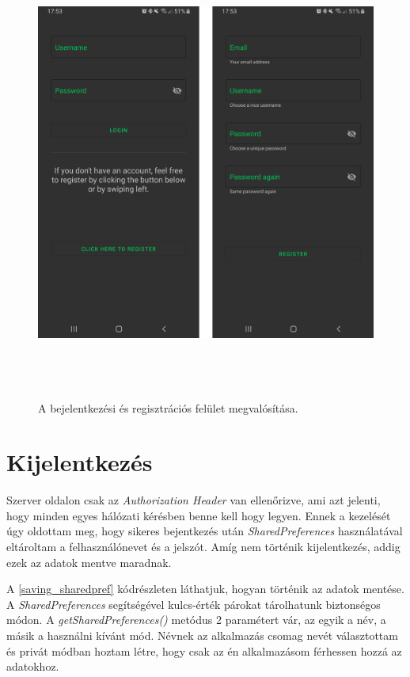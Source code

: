 \documentclass{thesis-ekf}
\theoremstyle{definition}
\theoremstyle{remark}
\begin{document}
\begin{figure}[!h]
	\centering
	\includegraphics[height=15cm]{pictures/android_login_registration}
	\caption{A bejelentkezési és regisztrációs felület megvalósítása.}
	\label{registration}
\end{figure}

\section{Kijelentkezés}

Szerver oldalon csak az \emph{Authorization Header} van ellenőrizve, ami azt jelenti, hogy minden egyes hálózati kérésben benne kell hogy legyen.
Ennek a kezelését úgy oldottam meg, hogy sikeres bejentkezés után \emph{SharedPreferences} használatával eltároltam a felhasználónevet és a jelszót.
Amíg nem történik kijelentkezés, addig ezek az adatok mentve maradnak.

A \ref{saving_sharedpref} kódrészleten láthatjuk, hogyan történik az adatok mentése.
A \emph{SharedPreferences} segítségével kulcs-érték párokat tárolhatunk biztonségos módon.
A \emph{getSharedPreferences()} metódus 2 paramétert vár, az egyik a név, a másik a használni kívánt mód. 
Névnek az alkalmazás csomag nevét választottam és privát módban hoztam létre, hogy csak az én alkalmazásom férhessen hozzá az adatokhoz.
\end{document}
